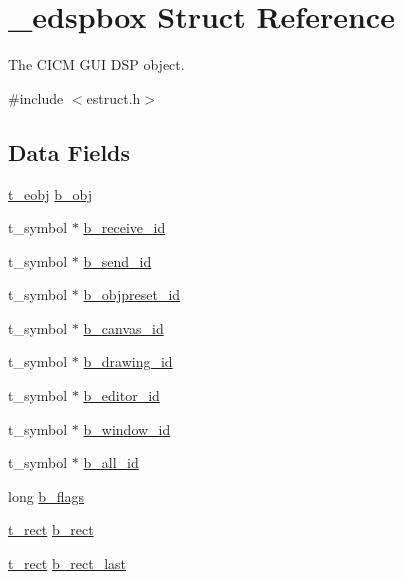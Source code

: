 \hypertarget{struct__edspbox}{\section{\-\_\-edspbox Struct Reference}
\label{struct__edspbox}
}


The C\-I\-C\-M G\-U\-I D\-S\-P object.  




{\ttfamily \#include $<$estruct.\-h$>$}

\subsection*{Data Fields}
\begin{DoxyCompactItemize}
\item 
\hyperlink{struct__eobj}{t\-\_\-eobj} \hyperlink{struct__edspbox_a384a670299e98768527fbe457de9a38a}{b\-\_\-obj}
\item 
t\-\_\-symbol $\ast$ \hyperlink{struct__edspbox_a3fb2b6968877ffd009753ccc0fe96769}{b\-\_\-receive\-\_\-id}
\item 
t\-\_\-symbol $\ast$ \hyperlink{struct__edspbox_ac59460230e622f821660b599e2f96ca9}{b\-\_\-send\-\_\-id}
\item 
t\-\_\-symbol $\ast$ \hyperlink{struct__edspbox_adc377263d208d1051f4a0997868b1155}{b\-\_\-objpreset\-\_\-id}
\item 
t\-\_\-symbol $\ast$ \hyperlink{struct__edspbox_ac0251c6969a1032f8f50d076e909fb3e}{b\-\_\-canvas\-\_\-id}
\item 
t\-\_\-symbol $\ast$ \hyperlink{struct__edspbox_a153f9c9929d722ecb29217f3fb0914c9}{b\-\_\-drawing\-\_\-id}
\item 
t\-\_\-symbol $\ast$ \hyperlink{struct__edspbox_adf8c80c6ea45ad810c754984d98830ff}{b\-\_\-editor\-\_\-id}
\item 
t\-\_\-symbol $\ast$ \hyperlink{struct__edspbox_a7033df943e798c68e3a6117785c2d79e}{b\-\_\-window\-\_\-id}
\item 
t\-\_\-symbol $\ast$ \hyperlink{struct__edspbox_a0f63dcf604135dd4fbfbf43eaed53c1a}{b\-\_\-all\-\_\-id}
\item 
long \hyperlink{struct__edspbox_abdae234dbd983dfbfb0592858c4ff026}{b\-\_\-flags}
\item 
\hyperlink{struct__rect}{t\-\_\-rect} \hyperlink{struct__edspbox_abc70ff46c135ee9f377a038bbc05a33e}{b\-\_\-rect}
\item 
\hyperlink{struct__rect}{t\-\_\-rect} \hyperlink{struct__edspbox_a2a0a15d3bc005cd4f815088b230b5ebd}{b\-\_\-rect\-\_\-last}

\end{DoxyCompactItemize}
